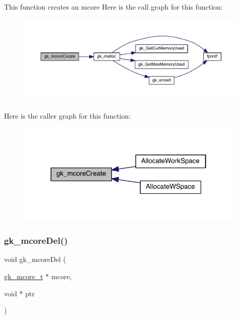 This function creates an mcore Here is the call graph for this function\+:\nopagebreak
\begin{figure}[H]
\begin{center}
\leavevmode
\includegraphics[width=350pt]{a00077_aba5df0f5155d88c0331fd6c996b483ed_cgraph}
\end{center}
\end{figure}
Here is the caller graph for this function\+:\nopagebreak
\begin{figure}[H]
\begin{center}
\leavevmode
\includegraphics[width=310pt]{a00077_aba5df0f5155d88c0331fd6c996b483ed_icgraph}
\end{center}
\end{figure}
\mbox{\label{a00077_a0e63861ea56a62080a63408af43a9075}} 
\subsubsection{\texorpdfstring{gk\+\_\+mcore\+Del()}{gk\_mcoreDel()}}
{\footnotesize\ttfamily void gk\+\_\+mcore\+Del (\begin{DoxyParamCaption}\item[{\hyperlink{a00682}{gk\+\_\+mcore\+\_\+t} $\ast$}]{mcore,  }\item[{void $\ast$}]{ptr }\end{DoxyParamCaption})}

